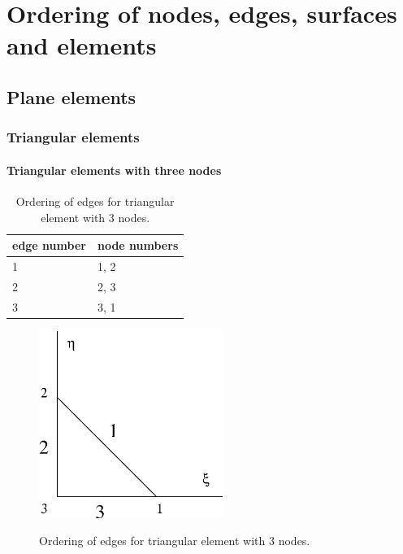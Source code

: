 \chapter{Ordering of nodes, edges, surfaces and elements}

\section{Plane elements}

\subsection{Triangular elements}

\subsubsection{Triangular elements with three nodes}

\begin{table}[h]
\begin{center}
\begin{tabular}{|l|l|}
\hline
edge number & node numbers
\\ \hline
1 & 1, 2
\\ \hline
2 & 2, 3
\\ \hline
3 & 3, 1
\\ \hline
\end{tabular}
\label{tablintriangedges}
\caption{Ordering of edges for triangular element with 3 nodes.}
\end{center}
\end{table}

\begin{figure}[h]
\begin{center}
\includegraphics[width=60mm]{FIG/lintriangedges.eps}
\label{figlintriangedges}
\caption{Ordering of edges for triangular element with 3 nodes.}
\end{center}
\end{figure}


